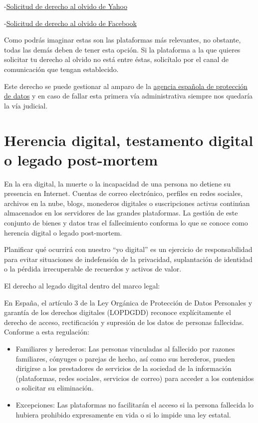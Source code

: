 \documentclass[
  spanish,
  a4paper,
  openany]{book}
\begin{document}
-\href{https://es-us.ayuda.yahoo.com/kb/Eliminaci\%C3\%B3n-de-resultados-de-b\%C3\%BAsqueda-de-Yahoo-Search-sln4530.html}{Solicitud de derecho al olvido de Yahoo}

-\href{https://www.facebook.com/help/217091804975136}{Solicitud de derecho al olvido de Facebook}

Como podrás imaginar estas son las plataformas más relevantes, no obstante, todas las demás deben de tener esta opción. Si la plataforma a la que quieres solicitar tu derecho al olvido no está entre éstas, solicítalo por el canal de comunicación que tengan establecido.

Este derecho se puede gestionar al amparo de la \href{https://www.aepd.es/es/areas-de-actuacion/internet-y-redes-sociales/derecho-al-olvido}{agencia española de protección de datos} y en caso de fallar esta primera vía administrativa siempre nos quedaría la vía judicial.

\section{Herencia digital, testamento digital o legado post-mortem}\label{herencia-digital-testamento-digital-o-legado-post-mortem}

En la era digital, la muerte o la incapacidad de una persona no detiene su presencia en Internet. Cuentas de correo electrónico, perfiles en redes sociales, archivos en la nube, blogs, monederos digitales o suscripciones activas continúan almacenados en los servidores de las grandes plataformas. La gestión de este conjunto de bienes y datos tras el fallecimiento conforma lo que se conoce como herencia digital o legado post-mortem.

Planificar qué ocurrirá con nuestro ``yo digital'' es un ejercicio de responsabilidad para evitar situaciones de indefensión de la privacidad, suplantación de identidad o la pérdida irrecuperable de recuerdos y activos de valor.

El derecho al legado digital dentro del marco legal:

En España, el artículo 3 de la Ley Orgánica de Protección de Datos Personales y garantía de los derechos digitales (LOPDGDD) reconoce explícitamente el derecho de acceso, rectificación y supresión de los datos de personas fallecidas. Conforme a esta regulación:

\begin{itemize}
\item
  Familiares y herederos: Las personas vinculadas al fallecido por razones familiares, cónyuges o parejas de hecho, así como sus herederos, pueden dirigirse a los prestadores de servicios de la sociedad de la información (plataformas, redes sociales, servicios de correo) para acceder a los contenidos o solicitar su eliminación.
\item
  Excepciones: Las plataformas no facilitarán el acceso si la persona fallecida lo hubiera prohibido expresamente en vida o si lo impide una ley estatal.
\end{itemize}
\end{document}
